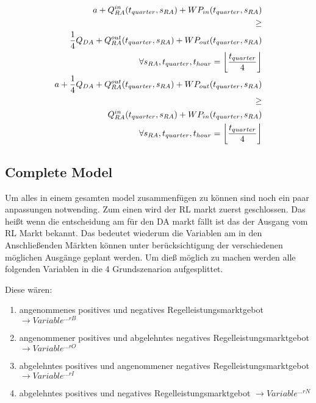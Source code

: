 \begin{alignat}{3}
	a + Q^{in}_{RA}(t_{quarter}, s_{RA}) +  WP_{in}(t_{quarter}, s_{RA}) \notag                                             \\
	\geq \notag                                                                                                             \\
	\frac{1}{4} Q_{DA}  + Q^{out}_{RA}(t_{quarter}, s_{RA}) + WP_{out}(t_{quarter}, s_{RA}) \notag                          \\
	\quad \forall s_{RA},  t_{quarter},  t_{hour} = \left\lfloor \frac{t_{quarter}}{4}\right\rfloor\label{eq:a_general_pos} \\
	a + \frac{1}{4}Q_{DA} +  Q^{out}_{RA}(t_{quarter}, s_{RA}) + WP_{out}(t_{quarter}, s_{RA}) \notag                       \\
	\geq \notag                                                                                                             \\
	Q^{in}_{RA}(t_{quarter}, s_{RA}) +  WP_{in}(t_{quarter}, s_{RA}) \notag                                                 \\
	\quad \forall s_{RA},  t_{quarter},  t_{hour} = \left\lfloor \frac{t_{quarter}}{4}\right\rfloor \label{eq:a_general_neg}
\end{alignat}




\subsection{Complete Model}
\label{subsec:completeModel}
Um alles in einem gesamten model zusammenfügen zu können sind noch ein paar anpassungen notwending.
Zum einen wird der RL markt zuerst geschlossen. Das heißt wenn die entscheidung am für den DA markt fällt ist das der Ausgang vom RL Markt bekannt.
Das bedeutet wiederum die Variablen am in den Anschließenden Märkten können unter berücksichtigung der verschiedenen möglichen Ausgänge geplant werden.
Um dieß möglich zu machen werden alle folgenden Variablen in die 4 Grundszenarion aufgesplittet.

Diese wären:
\begin{enumerate}
	\item angenommenes positives und negatives Regelleistungsmarktgebot	$\rightarrow Variable^{...rB}$
	\item angenommener positives und abgelehntes negatives Regelleistungsmarktgebot $\rightarrow Variable^{...rO}$
	\item abgelehntes positives und angenommener negatives Regelleistungsmarktgebot $\rightarrow Variable^{...rI}$
	\item abgelehntes positives und negatives Regelleistungsmarktgebot $\rightarrow Variable^{...rN}$
\end{enumerate}

